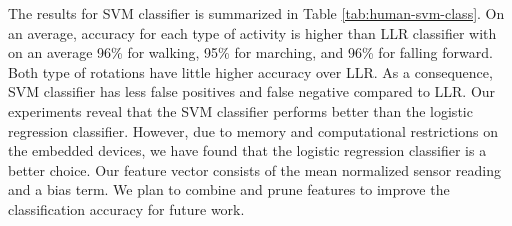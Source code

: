\documentclass{IEEEtran}
\begin{document}
%

The results for SVM classifier is summarized in Table \ref{tab:human-svm-class}. On an average, 
accuracy for each type of activity is higher than LLR classifier with on an average 96\% for 
walking, 95\% for marching, and 96\% for falling forward. Both type of rotations have little higher accuracy over LLR. As a consequence, SVM classifier has less false positives and false negative compared to LLR.  Our experiments reveal that the SVM classifier performs better than the logistic regression classifier. However, due to memory and 
computational restrictions on the embedded devices, we have found that the logistic 
regression classifier is a better choice.  Our feature vector consists of the mean normalized sensor 
reading and a bias term. We plan to combine and prune features to improve the classification 
accuracy for future work.  
\end{document}
